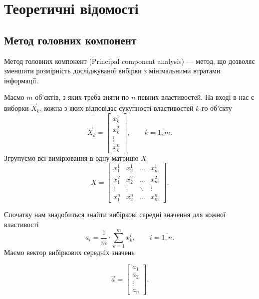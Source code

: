 \section{Теоретичні відомості}
\subsection{Метод головних компонент}
Метод головних компонент (Principal component analysis) --- метод, що дозволяє
зменшити розмірність досліджуваної вибірки з мінімальними втратами інформації.
\cite{Aivazyan:1989}

Маємо $m$ об’єктів, з яких треба зняти по $n$ певних властивостей.
На вході в нас є виборки $\vec{X}_k$, кожна з яких відповідає сукупності
властивостей $k$-го об’єкту
\begin{equation*}
  \vec{X}_k = \begin{bmatrix}
    x_k^1  \\
    x_k^2  \\
    \vdots \\
    x_k^n
  \end{bmatrix},
  \qquad k = \overline{1,m}.
\end{equation*}
Згрупуємо всі вимірювання в одну матрицю $X$
\begin{equation*}
  X = \begin{bmatrix}
    x_1^1  & x_2^1  & \dots  & x_m^1  \\
    x_1^2  & x_2^2  & \dots  & x_m^2  \\
    \vdots & \vdots & \ddots & \vdots \\
    x_1^n  & x_2^n  & \dots  & x_m^n
  \end{bmatrix}.
\end{equation*}

Спочатку нам знадобиться знайти вибіркові середні значення для кожної
властивості
\begin{equation*}
  a_i = \frac{1}{m} \cdot \sum_{k=1}^{m} x_k^i, \qquad i = \overline{1,n}.
\end{equation*}
Маємо вектор вибіркових середніх значень
\begin{comment}
\begin{equation*}
  \vec{a} = \begin{bmatrix}
    \frac{1}{m} \sum_{k=1}^{m} x_k^1 \\
    \frac{1}{m} \sum_{k=1}^{m} x_k^2 \\
    \vdots                           \\
    \frac{1}{m} \sum_{k=1}^{m} x_k^n \\
  \end{bmatrix}.
\end{equation*}
\end{comment}
\begin{equation*}
  \vec{a} = \begin{bmatrix}
    a_1    \\
    a_2    \\
    \vdots \\
    a_n
  \end{bmatrix}.
\end{equation*}

